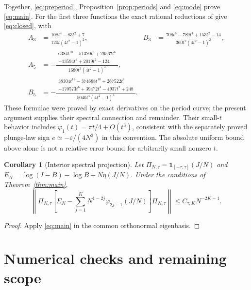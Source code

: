 \documentclass[10pt]{article}
\newtheorem{corollary}[theorem]{Corollary}
\newcommand{\ph}{\varphi}
\begin{document}
Together, \eqref{eq:preperiod}, Proposition~\ref{prop:periods}
and \eqref{eq:mode} prove \eqref{eq:main}.
For the first three functions the exact rational reductions of
\cite{periods} give \eqref{eq:closed}, with
\begin{align}
A_3&=\frac{108t^4-83t^2+7}{120t(4t^2-1)^2},&
B_3&=\frac{708t^6-789t^4+153t^2-14}{360t^2(4t^2-1)^2},\label{eq:AB3}\\
A_5&=-\frac{\begin{gathered}6384t^{10}-51320t^8+26567t^6\\[-2pt]
-13594t^4+2019t^2-124\end{gathered}}{1680t^3(4t^2-1)^4},\label{eq:A5}\\
B_5&=-\frac{\begin{gathered}38304t^{12}-374688t^{10}+267522t^8\\[-2pt]
-170573t^6+39472t^4-4937t^2+248\end{gathered}}{5040t^4(4t^2-1)^4}.
\label{eq:B5}
\end{align}
These formulae were proved by exact derivatives on the period
curve; the present argument supplies their spectral connection
and remainder. Their small-$t$ behavior includes
$\ph_1(t)=\pi t/4+O(t^3)$, consistent with the separately proved
plunge-law sign $e\simeq-\varepsilon/(4N^2)$ in this convention.
The absolute uniform bound above alone is not a relative error
bound for arbitrarily small nonzero $t$.

\begin{corollary}[Interior spectral projection]
Let $\Pi_{N,\tau}=\mathbf1_{[-\tau,\tau]}(J/N)$ and
$E_N=\log(I-B)-\log B+N\eta(J/N)$. Under the conditions of
Theorem~\ref{thm:main},
\[
\left\|\Pi_{N,\tau}\left[E_N-
 \sum_{j=1}^KN^{1-2j}\ph_{2j-1}(J/N)\right]\Pi_{N,\tau}\right\|
\le C_{\tau,K}N^{-2K-1}.
\]
\end{corollary}
\begin{proof}
Apply \eqref{eq:main} in the common orthonormal eigenbasis.
\end{proof}



\section{Numerical checks and remaining scope}
\end{document}
